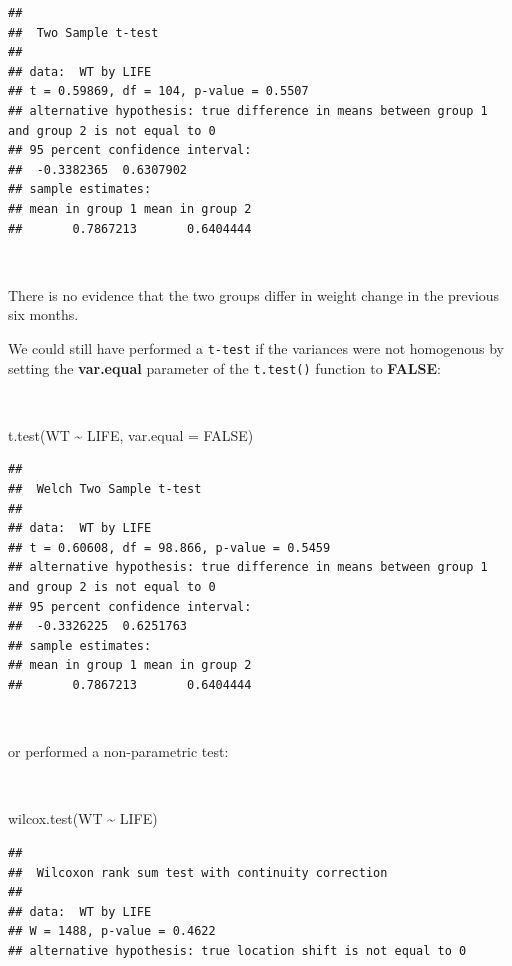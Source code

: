 \documentclass[
  12pt,
]{book}
\newenvironment{Shaded}{\begin{snugshade}}{\end{snugshade}}
\newcommand{\AttributeTok}[1]{\textcolor[rgb]{0.77,0.63,0.00}{#1}}
\newcommand{\ConstantTok}[1]{\textcolor[rgb]{0.00,0.00,0.00}{#1}}
\newcommand{\FunctionTok}[1]{\textcolor[rgb]{0.00,0.00,0.00}{#1}}
\newcommand{\NormalTok}[1]{#1}
\newcommand{\SpecialCharTok}[1]{\textcolor[rgb]{0.00,0.00,0.00}{#1}}
\begin{document}
\begin{verbatim}
## 
##  Two Sample t-test
## 
## data:  WT by LIFE
## t = 0.59869, df = 104, p-value = 0.5507
## alternative hypothesis: true difference in means between group 1 and group 2 is not equal to 0
## 95 percent confidence interval:
##  -0.3382365  0.6307902
## sample estimates:
## mean in group 1 mean in group 2 
##       0.7867213       0.6404444
\end{verbatim}

~

There is no evidence that the two groups differ in weight change in the previous six months.

We could still have performed a \texttt{t-test} if the variances were not homogenous by setting the \textbf{var.equal} parameter of the \texttt{t.test()} function to \textbf{FALSE}:

~

\begin{Shaded}
\begin{Highlighting}[]
\FunctionTok{t.test}\NormalTok{(WT }\SpecialCharTok{\textasciitilde{}}\NormalTok{ LIFE, }\AttributeTok{var.equal =} \ConstantTok{FALSE}\NormalTok{)}
\end{Highlighting}
\end{Shaded}

\begin{verbatim}
## 
##  Welch Two Sample t-test
## 
## data:  WT by LIFE
## t = 0.60608, df = 98.866, p-value = 0.5459
## alternative hypothesis: true difference in means between group 1 and group 2 is not equal to 0
## 95 percent confidence interval:
##  -0.3326225  0.6251763
## sample estimates:
## mean in group 1 mean in group 2 
##       0.7867213       0.6404444
\end{verbatim}

~

or performed a non-parametric test:

~

\begin{Shaded}
\begin{Highlighting}[]
\FunctionTok{wilcox.test}\NormalTok{(WT }\SpecialCharTok{\textasciitilde{}}\NormalTok{ LIFE)}
\end{Highlighting}
\end{Shaded}

\begin{verbatim}
## 
##  Wilcoxon rank sum test with continuity correction
## 
## data:  WT by LIFE
## W = 1488, p-value = 0.4622
## alternative hypothesis: true location shift is not equal to 0
\end{verbatim}
\end{document}
